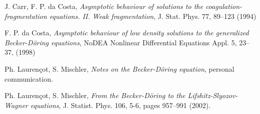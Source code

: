 \documentclass{article}
\begin{document}
\begin{multicols}{2}
\begin{thebibliography}{}
 J. Carr, F. P. da Costa, \emph{Asymptotic behaviour of
    solutions to the coagulation-fragmentation equations. II. Weak
    fragmentation}, J. Stat. Phys. 77, 89--123 (1994)

 F. P. da Costa, \emph{Asymptotic behaviour of low
    density solutions to the generalized Becker-D\"oring equations},
  NoDEA Nonlinear Differential Equations Appl. 5, 23--37, (1998)
  
 Ph. Lauren\c{c}ot, S. Mischler, \emph{Notes on the
    Becker-D\"oring equation}, personal communication.

 Ph. Lauren{\c{c}}ot, S. Mischler, \emph{From the
    {B}ecker-{D}\"oring to the {L}ifshitz-{S}lyozov-{W}agner
    equations}, J. Statist. Phys. 106, 5-6, pages 957--991 (2002).

\end{thebibliography}


\end{multicols}
\end{document}
